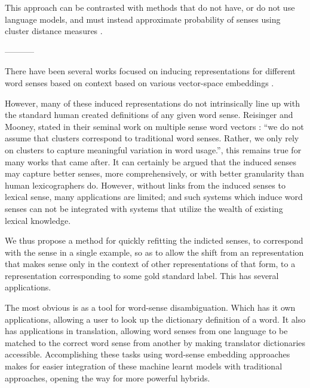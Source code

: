 \documentclass{sig-alternate}
\begin{document}
This approach can be contrasted with methods that do not have, or do not use language models, and must instead approximate probability of senses using cluster distance measures \parencite{Reisinger2010,Huang2012}. 

-----------


There have been several works focused on inducing representations for different word senses based on context based on various vector-space embeddings \parencite{Reisinger2010,Huang2012,AdaGrams,Chen2014,iacobacci2015sensembed}.



However, many of these induced representations do not intrinsically line up with the standard human created definitions of any given word sense.
Reisinger and Mooney, stated in their seminal work on multiple sense word vectors \parencite{Reisinger2010}: \enquote{we  do
not  assume  that  clusters  correspond  to  traditional
word senses. Rather, we only rely on clusters to capture meaningful variation in word usage.}, this remains true for many works that came after\parencite{Huang2012,AdaGrams}.
It can certainly be argued that the induced senses may capture better senses, more comprehensively, or with better granularity than human lexicographers do.
However, without links from the induced senses to lexical sense, many applications are limited; and such systems which induce word senses can not be integrated with systems that utilize the wealth of existing lexical knowledge.

We thus propose a method for quickly refitting the indicted senses, to correspond with the sense in a single example, so as to allow the shift from an representation that makes sense only in the context of other representations of that form, to a representation corresponding to some gold standard label. This has several applications.

The most obvious is as a tool for word-sense disambiguation. Which has it own applications, allowing a user to look up the dictionary definition of a word. It also has applications in translation, allowing word senses from one language to be matched to the correct word sense from another by making translator dictionaries accessible. 
Accomplishing these tasks using word-sense embedding approaches makes for easier integration of these machine learnt models with traditional approaches, opening the way for more powerful hybrids.
\end{document}

